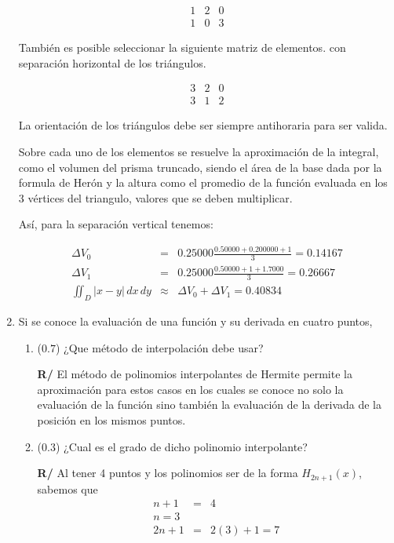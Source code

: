 \documentclass[12pt]{article}
\begin{document}
\begin{enumerate}[leftmargin=*,widest=9]
\[
\begin{array}{ccc}
1 & 2 & 0\\
1 & 0 & 3
\end{array}
\]

También es posible seleccionar la siguiente matriz de elementos. con separación horizontal de los triángulos.

\[
\begin{array}{ccc}
3 & 2 & 0\\
3 & 1 & 2
\end{array}
\]

La orientación de los triángulos debe ser siempre antihoraria para ser valida.

Sobre cada uno de los elementos se resuelve la aproximación de la integral, como el volumen del prisma truncado, siendo el área de la base dada por la formula de Herón y la altura como el promedio de la función evaluada en los 3 vértices del triangulo, valores que se deben multiplicar.

Así, para la separación vertical tenemos:

\begin{eqnarray*}
\Delta V_0 &=& 0.25000 \frac{0.50000+0.200000+1}{3} = 0.14167\\
\Delta V_1 &=& 0.25000 \frac{0.50000+1+1.7000}{3} = 0.26667\\
\iint_D |x-y|\,dx\,dy &\approx & \Delta V_0 + \Delta V_1 = 0.40834
\end{eqnarray*}


    \item Si se conoce la evaluación de una función y su derivada en cuatro puntos,

   \begin{enumerate}[label=\alph*]
    \item (\(0.7\)) ¿Que método de interpolación debe usar?


    \textbf{R/} El método de polinomios interpolantes de Hermite permite la aproximación para estos casos en los cuales se conoce no solo la evaluación de la función sino también la evaluación de la derivada de la posición en los mismos puntos.

    \item (\(0.3\)) ¿Cual es el grado de dicho polinomio interpolante?

	\textbf{R/} Al tener 4 puntos y los polinomios ser de la forma \(H_{2n+1}(x)\), sabemos que
	\begin{eqnarray*}
	n + 1 &=& 4\\
	n = 3 \\
	2n + 1 &=& 2(3)+1 = 7
\end{eqnarray*}

    \end{enumerate}

\end{enumerate}
\end{document}
